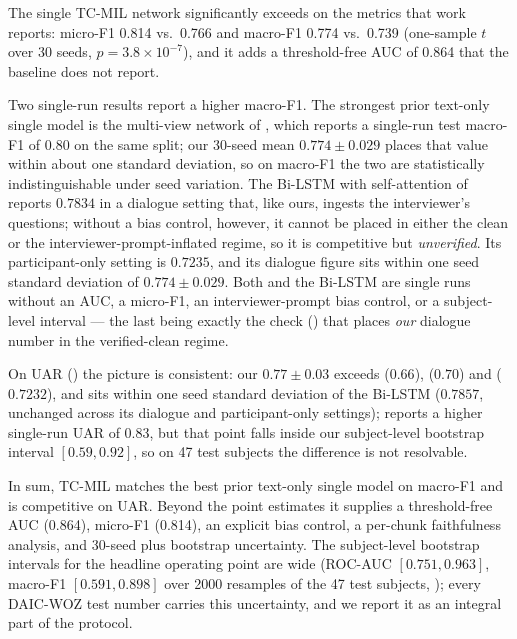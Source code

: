 \documentclass[conference]{IEEEtran}
\begin{document}
The single TC-MIL network significantly exceeds \cite{milintsevich2023} on the
metrics that work reports: micro-F1 0.814 vs.\ 0.766 and macro-F1 0.774 vs.\
0.739 (one-sample $t$ over 30 seeds, $p=3.8\!\times\!10^{-7}$), and it adds a
threshold-free AUC of 0.864 that the baseline does not report.

Two single-run results report a higher macro-F1. The strongest prior text-only
single model is the multi-view network of \cite{agarwal2024}, which reports a
single-run test macro-F1 of 0.80 on the same split; our 30-seed mean
$0.774\pm0.029$ places that value within about one standard deviation, so on
macro-F1 the two are statistically indistinguishable under seed variation. The
Bi-LSTM with self-attention of \cite{10006532} reports $0.7834$ in a dialogue
setting that, like ours, ingests the interviewer's questions; without a bias
control, however, it cannot be placed in either the clean or the
interviewer-prompt-inflated regime, so it is competitive but \emph{unverified}.
Its participant-only setting is $0.7235$, and its dialogue figure sits within one
seed standard deviation of $0.774\pm0.029$. Both \cite{agarwal2024} and the
Bi-LSTM are single runs without an AUC, a micro-F1, an interviewer-prompt bias
control, or a subject-level interval --- the last being exactly the check
(\Cref{sec:interpret}) that places \emph{our} dialogue number in the
verified-clean regime.

On UAR () the picture is consistent: our $0.77\pm0.03$ exceeds
\cite{mallolragolta2019} ($0.66$), \cite{xezonaki20_interspeech} ($0.70$) and
\cite{agarwal2022mv} ($0.7232$), and sits within one seed standard deviation of
the Bi-LSTM ($0.7857$, unchanged across its dialogue and participant-only
settings); \cite{agarwal2024} reports a higher single-run UAR of $0.83$, but that
point falls inside our subject-level bootstrap interval $[0.59, 0.92]$, so on 47
test subjects the difference is not resolvable.

In sum, TC-MIL matches the best prior text-only single model on macro-F1 and is
competitive on UAR. Beyond the point estimates it supplies a threshold-free AUC
(0.864), micro-F1 (0.814), an explicit bias control, a per-chunk faithfulness
analysis, and 30-seed plus bootstrap uncertainty. The subject-level bootstrap
intervals for the headline operating point are wide (ROC-AUC $[0.751, 0.963]$,
macro-F1 $[0.591, 0.898]$ over 2000 resamples of the 47 test subjects,
\Cref{tab:external}); every DAIC-WOZ test number carries this uncertainty, and we
report it as an integral part of the protocol.
\end{document}
